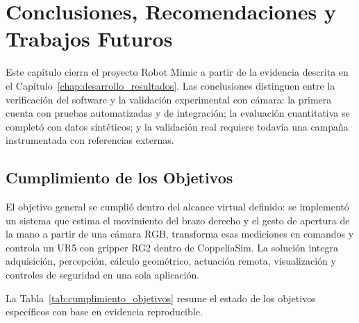 
\chapter{Conclusiones, Recomendaciones y Trabajos Futuros}
\label{chap:conclusiones}

Este capítulo cierra el proyecto Robot Mimic a partir de la evidencia descrita
en el Capítulo~\ref{chap:desarrollo_resultados}. Las conclusiones distinguen
entre la verificación del software y la validación experimental con cámara:
la primera cuenta con pruebas automatizadas y de integración; la evaluación
cuantitativa se completó con datos sintéticos; y la validación real requiere
todavía una campaña instrumentada con referencias externas.

\section{Cumplimiento de los Objetivos}
\label{sec:cumplimiento_objetivos}

El objetivo general se cumplió dentro del alcance virtual definido: se
implementó un sistema que estima el movimiento del brazo derecho y el gesto de
apertura de la mano a partir de una cámara RGB, transforma esas mediciones en
comandos y controla un UR5 con gripper RG2 dentro de CoppeliaSim. La solución
integra adquisición, percepción, cálculo geométrico, actuación remota,
visualización y controles de seguridad en una sola aplicación.

La Tabla~\ref{tab:cumplimiento_objetivos} resume el estado de los objetivos
específicos con base en evidencia reproducible.


